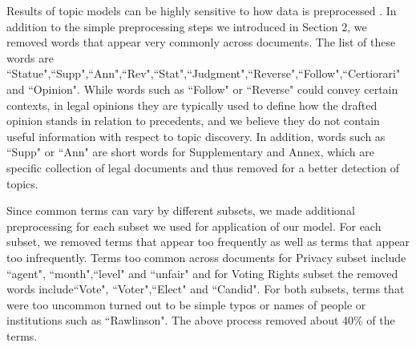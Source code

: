 Results of topic models can be highly sensitive to how data is preprocessed \citep{denny2018text}. In addition to the simple preprocessing steps we introduced in Section 2, we removed words that appear very commonly across documents. The list of these words are ``Statue",``Supp",``Ann",``Rev",``Stat",``Judgment",``Reverse",``Follow",``Certiorari" and ``Opinion". While words such as ``Follow" or ``Reverse" could convey certain contexts, in legal opinions they are typically used to define how the drafted opinion stands in relation to precedents, and we believe they do not contain useful information with respect to topic discovery. In addition, words such as ``Supp" or ``Ann" are short words for Supplementary and Annex, which are specific collection of legal documents and thus removed for a better detection of topics. 

Since common terms can vary by different subsets, we made additional preprocessing for each subset we used for application of our model. For each subset, we removed terms that appear too frequently as well as terms that appear too infrequently. Terms too common across documents for Privacy subset include ``agent", ``month",``level" and ``unfair" and for Voting Rights subset the removed words include``Vote", ``Voter",``Elect" and ``Candid". For both subsets, terms that were too uncommon turned out to be simple typos or names of people or institutions such as ``Rawlinson".  The above process removed about 40\% of the terms. 
